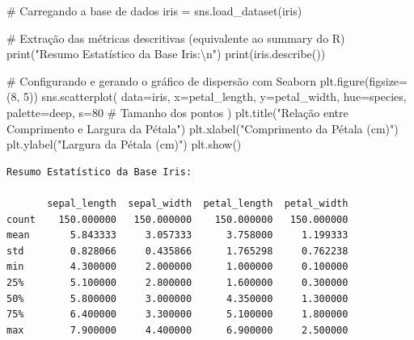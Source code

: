 \documentclass[
  brazilian,
  letterpaper,
  DIV=11,
  numbers=noendperiod]{scrreprt}
\newenvironment{Shaded}{\begin{snugshade}}{\end{snugshade}}
\newcommand{\BuiltInTok}[1]{\textcolor[rgb]{0.00,0.23,0.31}{#1}}
\newcommand{\CharTok}[1]{\textcolor[rgb]{0.13,0.47,0.30}{#1}}
\newcommand{\CommentTok}[1]{\textcolor[rgb]{0.37,0.37,0.37}{#1}}
\newcommand{\DecValTok}[1]{\textcolor[rgb]{0.68,0.00,0.00}{#1}}
\newcommand{\NormalTok}[1]{\textcolor[rgb]{0.00,0.23,0.31}{#1}}
\newcommand{\OperatorTok}[1]{\textcolor[rgb]{0.37,0.37,0.37}{#1}}
\newcommand{\StringTok}[1]{\textcolor[rgb]{0.13,0.47,0.30}{#1}}
\begin{document}
\begin{Shaded}
\begin{Highlighting}[]
\CommentTok{\# Carregando a base de dados}
\NormalTok{iris }\OperatorTok{=}\NormalTok{ sns.load\_dataset(}\StringTok{\textquotesingle{}iris\textquotesingle{}}\NormalTok{)}

\CommentTok{\# Extração das métricas descritivas (equivalente ao summary do R)}
\BuiltInTok{print}\NormalTok{(}\StringTok{"Resumo Estatístico da Base Iris:}\CharTok{\textbackslash{}n}\StringTok{"}\NormalTok{)}
\BuiltInTok{print}\NormalTok{(iris.describe())}

\CommentTok{\# Configurando e gerando o gráfico de dispersão com Seaborn}
\NormalTok{plt.figure(figsize}\OperatorTok{=}\NormalTok{(}\DecValTok{8}\NormalTok{, }\DecValTok{5}\NormalTok{))}
\NormalTok{sns.scatterplot(}
\NormalTok{    data}\OperatorTok{=}\NormalTok{iris, }
\NormalTok{    x}\OperatorTok{=}\StringTok{\textquotesingle{}petal\_length\textquotesingle{}}\NormalTok{, }
\NormalTok{    y}\OperatorTok{=}\StringTok{\textquotesingle{}petal\_width\textquotesingle{}}\NormalTok{, }
\NormalTok{    hue}\OperatorTok{=}\StringTok{\textquotesingle{}species\textquotesingle{}}\NormalTok{, }
\NormalTok{    palette}\OperatorTok{=}\StringTok{\textquotesingle{}deep\textquotesingle{}}\NormalTok{,}
\NormalTok{    s}\OperatorTok{=}\DecValTok{80} \CommentTok{\# Tamanho dos pontos}
\NormalTok{)}
\NormalTok{plt.title(}\StringTok{"Relação entre Comprimento e Largura da Pétala"}\NormalTok{)}
\NormalTok{plt.xlabel(}\StringTok{"Comprimento da Pétala (cm)"}\NormalTok{)}
\NormalTok{plt.ylabel(}\StringTok{"Largura da Pétala (cm)"}\NormalTok{)}
\NormalTok{plt.show()}
\end{Highlighting}
\end{Shaded}

\begin{verbatim}
Resumo Estatístico da Base Iris:

       sepal_length  sepal_width  petal_length  petal_width
count    150.000000   150.000000    150.000000   150.000000
mean       5.843333     3.057333      3.758000     1.199333
std        0.828066     0.435866      1.765298     0.762238
min        4.300000     2.000000      1.000000     0.100000
25%        5.100000     2.800000      1.600000     0.300000
50%        5.800000     3.000000      4.350000     1.300000
75%        6.400000     3.300000      5.100000     1.800000
max        7.900000     4.400000      6.900000     2.500000
\end{verbatim}
\end{document}
